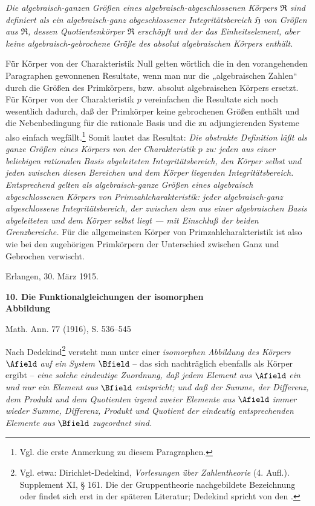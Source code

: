 \documentclass[11pt]{article}
\begin{document}
\emph{Die algebraisch-ganzen Größen eines algebraisch-abgeschlossenen Körpers
$\mathfrak R$ sind definiert als ein algebraisch-ganz abgeschlossener
Integritätsbereich $\mathfrak H$ von Größen aus $\mathfrak R$, dessen
Quotientenkörper $\mathfrak R$ erschöpft und der das Einheitselement, aber keine
algebraisch-gebrochene Größe des absolut algebraischen Körpers enthält.}

Für Körper von der Charakteristik Null gelten wörtlich die in den vorangehenden
Paragraphen gewonnenen Resultate, wenn man nur die „algebraischen Zahlen“ durch
die Größen des Primkörpers, bzw. absolut algebraischen Körpers ersetzt. Für
Körper von der Charakteristik $p$ vereinfachen die Resultate sich noch
wesentlich dadurch, daß der Primkörper keine gebrochenen Größen enthält und die
Nebenbedingung für die rationale Basis und die zu adjungierenden Systeme also
einfach wegfällt.\footnote{Vgl. die erste Anmerkung zu diesem Paragraphen.}
Somit lautet das Resultat: \emph{Die abstrakte Definition läßt als ganze Größen
eines Körpers von der Charakteristik $p$ zu: jeden aus einer beliebigen
rationalen Basis abgeleiteten Integritätsbereich, den Körper selbst und jeden
zwischen diesen Bereichen und dem Körper liegenden Integritätsbereich.
Entsprechend gelten als algebraisch-ganze Größen eines algebraisch
abgeschlossenen Körpers von Primzahlcharakteristik: jeder algebraisch-ganz
abgeschlossene Integritätsbereich, der zwischen dem aus einer algebraischen Basis
abgeleiteten und dem Körper selbst liegt --- mit Einschluß der beiden
Grenzbereiche.} Für die allgemeinsten Körper von Primzahlcharakteristik ist also
wie bei den zugehörigen Primkörpern der Unterschied zwischen Ganz und Gebrochen
verwischt.

\medskip
\noindent Erlangen, 30. März 1915.

\clearpage

\begin{center}
{\Large\bfseries 10. Die Funktionalgleichungen der isomorphen\\ Abbildung}\par
\vspace{1.25em}
Math. Ann. 77 (1916), S. 536--545
\end{center}

\vspace{3em}

Nach Dedekind\footnote{Vgl. etwa: Dirichlet-Dedekind, \emph{Vorlesungen über Zahlentheorie} (4. Aufl.). Supplement XI, § 161. Die der Gruppentheorie nachgebildete Bezeichnung  oder  findet sich erst in der späteren Literatur; Dedekind spricht von den .} versteht man unter einer \emph{isomorphen Abbildung des Körpers} \(\Afield\) \emph{auf ein System} \(\Bfield\) -- das sich nachträglich ebenfalls als Körper ergibt -- \emph{eine solche eindeutige Zuordnung, daß jedem Element aus} \(\Afield\) \emph{ein und nur ein Element aus} \(\Bfield\) \emph{entspricht; und daß der Summe, der Differenz, dem Produkt und dem Quotienten irgend zweier Elemente aus} \(\Afield\) \emph{immer wieder Summe, Differenz, Produkt und Quotient der eindeutig entsprechenden Elemente aus} \(\Bfield\) \emph{zugeordnet sind.}
\end{document}
